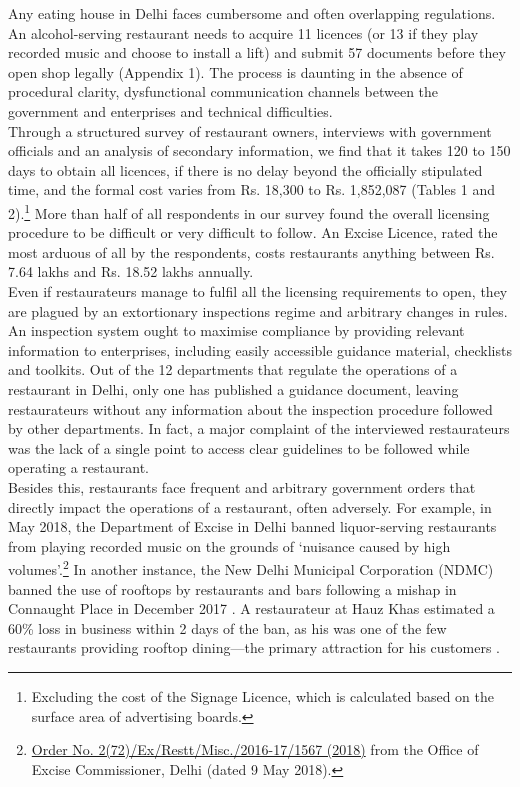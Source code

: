 \documentclass[a4paper, 12pt, twoside]{article}
\begin{document}
          Any eating house in Delhi faces cumbersome and often overlapping regulations. An alcohol-serving restaurant needs to acquire 11 licences (or 13 if they play recorded music and choose to install a lift) and submit 57 documents before they open shop legally (Appendix 1). The process is daunting in the absence of procedural clarity, dysfunctional communication channels between the government and enterprises and technical difficulties.  \\
                    
                    Through a structured survey of restaurant owners, interviews with government officials and an analysis of secondary information, we find that it takes 120 to 150 days to obtain all licences, if there is no delay beyond the officially stipulated time, and the formal cost varies from Rs. 18,300 to Rs. 1,852,087 (Tables 1 and 2).\footnote{Excluding the cost of the Signage Licence, which is calculated based on the surface area of advertising boards.} More than half of all respondents in our survey found the overall 
licensing procedure to be difficult or very difficult to follow. An Excise Licence, rated the most arduous of all by the respondents, costs restaurants anything between Rs. 7.64 lakhs and Rs. 18.52 lakhs annually. \\
                    
                    Even if restaurateurs manage to fulfil all the licensing requirements to open, they are plagued by an extortionary inspections regime and arbitrary changes in rules. An inspection system ought to maximise compliance by providing relevant information to 
enterprises, including easily accessible guidance material, checklists and toolkits. Out of the 12 departments that regulate the operations of a restaurant in Delhi, only one has published a guidance document, leaving restaurateurs without any information about the 
inspection procedure followed by other departments. In fact, a major complaint of the interviewed restaurateurs was the lack of a single point to access clear guidelines to be followed while operating a restaurant. \\
                    
                    Besides this, restaurants face frequent and arbitrary government orders that directly impact the operations of a restaurant, often adversely. For example, in May 2018, the Department of Excise in Delhi banned liquor-serving restaurants from playing 
recorded music on the grounds of ‘nuisance caused by high volumes’.\footnote{\href{https://bit.ly/2MzCM02}{Order No. 2(72)/Ex/Restt/Misc./2016-17/1567 (2018)} from the Office of Excise Commissioner, Delhi (dated 9 May 2018).} In another instance, the New 
Delhi Municipal Corporation (NDMC) banned the use of rooftops by restaurants and bars following a mishap in Connaught Place in December 2017 \parencite{toi2017rooftopbanCP}. A restaurateur at Hauz Khas estimated a 60\% loss in business  within 2 days of the ban, as his was one of the few restaurants providing rooftop dining—the primary attraction for his customers \parencite{toi2015hkvterraceshut}. \\
                    
\end{document}

